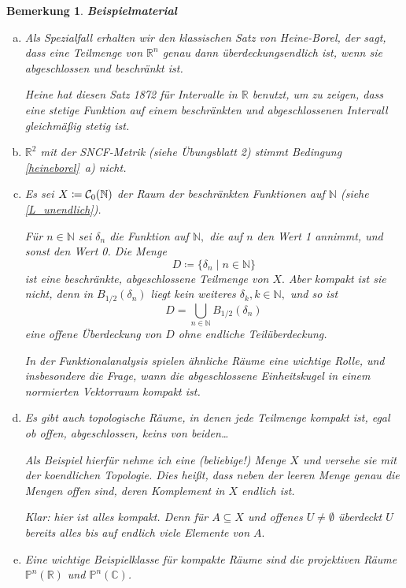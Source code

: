 \documentclass[12pt]{scrbook}   %
\newtheorem{bemX}[alles]{Bemerkung}
\newenvironment{bem}[1]{\begin{bemX}{\bf #1}\par\rm}{\end{bemX}}
\newcommand{\da}{\coloneqq}
\begin{document}
\begin{bem}{Beispielmaterial} \label{einige Kompakta} 

\begin{enumerate}[a)]
\item Als Spezialfall erhalten wir den klassischen Satz von Heine-Borel,
der sagt, dass eine Teilmenge von $\mathbb R^n$ genau dann überdeckungsendlich
ist, wenn sie abgeschlossen und beschränkt ist. 

Heine hat diesen Satz 1872 
für Intervalle in $\mathbb R$ benutzt, um zu zeigen, dass eine stetige 
Funktion auf einem beschränkten und abgeschlossenen Intervall gleichmäßig stetig ist.

\item $\mathbb R^2$ mit der SNCF-Metrik (siehe Übungsblatt 2) stimmt Bedingung \ref{heineborel}~a) nicht.

\item
Es sei $X\da{\cal C}_0(\mathbb N)$ der Raum der beschränkten Funktionen 
auf $\mathbb N$ (siehe \ref{L_unendlich}). 

Für $n\in\mathbb N$ sei $\delta_n$ die Funktion auf $\mathbb N,$ die
auf $n$ den Wert 1 annimmt, und sonst den Wert 0. Die Menge
$$D\da\{ \delta_n \mid n\in \mathbb N\}$$
ist eine beschränkte, abgeschlossene Teilmenge von $X.$ Aber kompakt ist sie 
nicht, denn in $B_{1/2}(\delta_n)$ liegt kein weiteres 
$\delta_k, k\in \mathbb N,$ und so ist
$$D = \bigcup_{n\in \mathbb N} B_{1/2}(\delta_n)$$
eine offene Überdeckung von $D$ ohne endliche Teilüberdeckung.

In der Funktionalanalysis spielen ähnliche Räume eine wichtige Rolle, und
insbesondere die Frage, wann die abgeschlossene Einheitskugel in einem 
normierten Vektorraum kompakt ist.

\item Es gibt auch topologische Räume, in denen {\it jede Teilmenge} 
kompakt ist, egal ob offen, abgeschlossen, keins von beiden\dots

Als Beispiel hierfür nehme ich eine (beliebige!) Menge $X$ und versehe sie
mit der {\it koendlichen} Topologie. Dies heißt, dass neben der leeren Menge
genau die Mengen offen sind, deren Komplement in $X$ endlich ist.

Klar: hier ist alles kompakt. Denn für $A\subseteq X$ und offenes 
$U\neq\emptyset$ 
überdeckt $U$ bereits alles bis auf endlich viele Elemente von $A.$

\item Eine wichtige Beispielklasse für kompakte Räume sind die
projektiven Räume $\mathbb P^n(\mathbb R)$ und $\mathbb P^n(\mathbb C)$.


\end{enumerate}
\end{bem}
\end{document}
